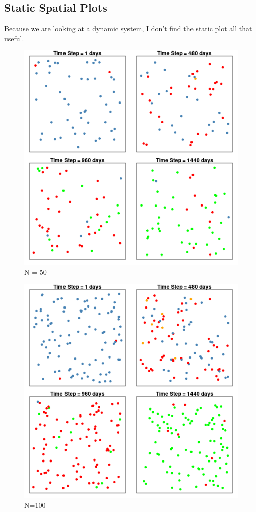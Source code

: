 \documentclass{article}\usepackage[]{graphicx}\usepackage[]{color}
\begin{document}
\subsection{Static Spatial Plots}

Because we are looking at a dynamic system, I don't find the static plot all that useful.



\begin{figure}
\includegraphics[width=1\textwidth]{SSModel1.png}
\caption{N = 50}
\end{figure}

\begin{figure}
\includegraphics[width=1\textwidth]{SSModel2.png}
\caption{N=100}
\end{figure}
\end{document}
